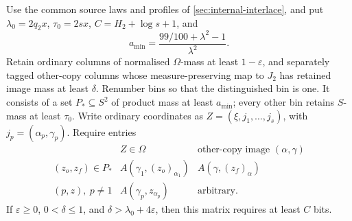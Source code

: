 \documentclass[11pt]{article} \usepackage[utf8]{inputenc}
\theoremstyle{plain} \newtheorem{theorem}{Theorem}[section]
\theoremstyle{definition} \newaliascnt{definition}{theorem}
\begin{document}
\begin{claim}\label{cl:two-stream}
Use the common source laws and profiles of \cref{sec:internal-interlace}, and put
$\lambda_0=2q_2x$, $\tau_0=2sx$, $C=H_2+\log s+1$, and
\[
a_{\min}=\frac{99/100+\lambda^2-1}{\lambda^2}.
\]
Retain ordinary columns of normalised $\Omega$-mass at least
$1-\varepsilon$, and separately tagged other-copy columns whose
measure-preserving map to $J_2$ has retained image mass at least $\delta$.
Renumber bins so that the distinguished bin is one. It consists of a set
$P_*\subseteq S^2$ of product mass at least $a_{\min}$; every other bin retains
$S$-mass at least $\tau_0$. Write ordinary coordinates as
$Z=(\xi,j_1,\ldots,j_s)$, with $j_p=(\alpha_p,\gamma_p)$. Require entries
\[
\begin{array}{c|cc}
 & Z\in\Omega&\text{other-copy image }(\alpha,\gamma)\\ \hline
(z_o,z_f)\in P_*&A(\gamma_1,(z_o)_{\alpha_1})&A(\gamma,(z_f)_\alpha)\\
(p,z),\ p\ne1&A(\gamma_p,z_{\alpha_p})&\text{arbitrary}.
\end{array}
\]
If $\varepsilon\ge0$, $0<\delta\le1$, and $\delta>\lambda_0+4\varepsilon$, then this matrix
requires at least $C$ bits.
\end{claim}
\end{document}
